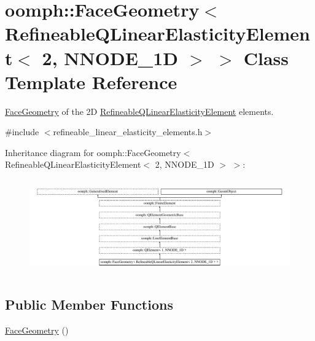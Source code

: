 \hypertarget{classoomph_1_1FaceGeometry_3_01RefineableQLinearElasticityElement_3_012_00_01NNODE__1D_01_4_01_4}{}\section{oomph\+:\+:Face\+Geometry$<$ Refineable\+Q\+Linear\+Elasticity\+Element$<$ 2, N\+N\+O\+D\+E\+\_\+1D $>$ $>$ Class Template Reference}
\label{classoomph_1_1FaceGeometry_3_01RefineableQLinearElasticityElement_3_012_00_01NNODE__1D_01_4_01_4}


\hyperlink{classoomph_1_1FaceGeometry}{Face\+Geometry} of the 2D \hyperlink{classoomph_1_1RefineableQLinearElasticityElement}{Refineable\+Q\+Linear\+Elasticity\+Element} elements.  




{\ttfamily \#include $<$refineable\+\_\+linear\+\_\+elasticity\+\_\+elements.\+h$>$}

Inheritance diagram for oomph\+:\+:Face\+Geometry$<$ Refineable\+Q\+Linear\+Elasticity\+Element$<$ 2, N\+N\+O\+D\+E\+\_\+1D $>$ $>$\+:\begin{figure}[H]
\begin{center}
\leavevmode
\includegraphics[height=4.100419cm]{classoomph_1_1FaceGeometry_3_01RefineableQLinearElasticityElement_3_012_00_01NNODE__1D_01_4_01_4}
\end{center}
\end{figure}
\subsection*{Public Member Functions}
\begin{DoxyCompactItemize}
\item 
\hyperlink{classoomph_1_1FaceGeometry_3_01RefineableQLinearElasticityElement_3_012_00_01NNODE__1D_01_4_01_4_a396a61bf54bff6545305377dc07d8424}{Face\+Geometry} ()
\end{DoxyCompactItemize}
